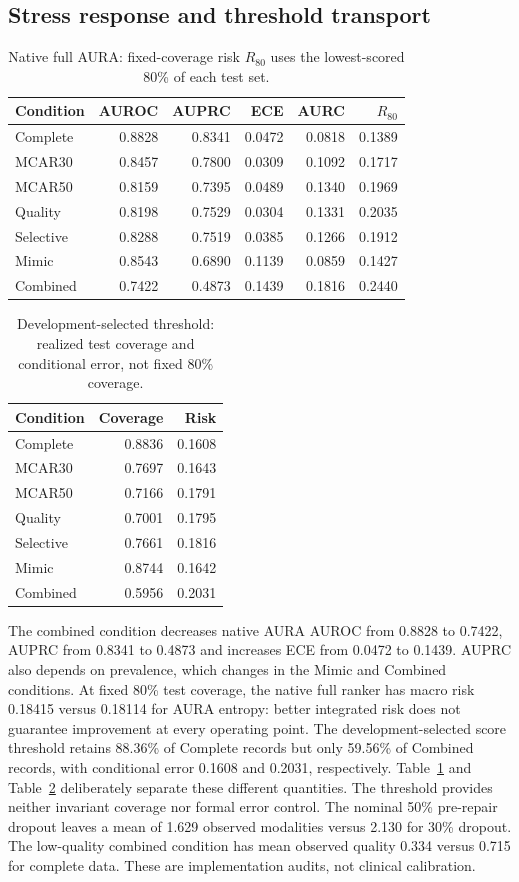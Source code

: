 \documentclass[conference]{IEEEtran}
\begin{document}
\subsection{Stress response and threshold transport}
\begin{table}[t]
\caption{Native full AURA: fixed-coverage risk $R_{80}$ uses the lowest-scored 80\% of each test set.}
\label{tab:stress}
\centering\footnotesize
\begin{tabular}{@{}lrrrrr@{}}\toprule
Condition & AUROC & AUPRC & ECE & AURC & $R_{80}$\\\midrule
Complete & 0.8828 & 0.8341 & 0.0472 & 0.0818 & 0.1389\\
MCAR30 & 0.8457 & 0.7800 & 0.0309 & 0.1092 & 0.1717\\
MCAR50 & 0.8159 & 0.7395 & 0.0489 & 0.1340 & 0.1969\\
Quality & 0.8198 & 0.7529 & 0.0304 & 0.1331 & 0.2035\\
Selective & 0.8288 & 0.7519 & 0.0385 & 0.1266 & 0.1912\\
Mimic & 0.8543 & 0.6890 & 0.1139 & 0.0859 & 0.1427\\
Combined & 0.7422 & 0.4873 & 0.1439 & 0.1816 & 0.2440\\\bottomrule
\end{tabular}
\end{table}
\begin{table}[t]
\caption{Development-selected threshold: realized test coverage and conditional error, not fixed 80\% coverage.}
\label{tab:threshold}
\centering\footnotesize
\begin{tabular}{@{}lrr@{}}\toprule
Condition & Coverage & Risk\\\midrule
Complete & 0.8836 & 0.1608\\
MCAR30 & 0.7697 & 0.1643\\
MCAR50 & 0.7166 & 0.1791\\
Quality & 0.7001 & 0.1795\\
Selective & 0.7661 & 0.1816\\
Mimic & 0.8744 & 0.1642\\
Combined & 0.5956 & 0.2031\\\bottomrule
\end{tabular}
\end{table}
The combined condition decreases native AURA AUROC from 0.8828 to 0.7422, AUPRC from 0.8341 to 0.4873 and increases ECE from 0.0472 to 0.1439. AUPRC also depends on prevalence, which changes in the Mimic and Combined conditions. At fixed 80\% test coverage, the native full ranker has macro risk 0.18415 versus 0.18114 for AURA entropy: better integrated risk does not guarantee improvement at every operating point. The development-selected score threshold retains 88.36\% of Complete records but only 59.56\% of Combined records, with conditional error 0.1608 and 0.2031, respectively. Table~\ref{tab:stress} and Table~\ref{tab:threshold} deliberately separate these different quantities. The threshold provides neither invariant coverage nor formal error control. The nominal 50\% pre-repair dropout leaves a mean of 1.629 observed modalities versus 2.130 for 30\% dropout. The low-quality combined condition has mean observed quality 0.334 versus 0.715 for complete data. These are implementation audits, not clinical calibration.
\end{document}
